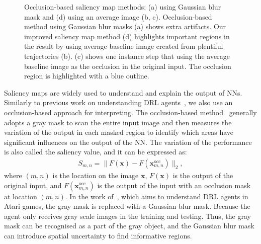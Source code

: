 \begin{figure}[h!]
\begin{subfigure}{0.24\columnwidth}
  \end{subfigure}
  \caption[Visualisation of different occlusion-based saliency map methods.]{Occlusion-based saliency map methods: (a) using Gaussian blur mask and (d) using an average image (b, c). Occlusion-based method using Gaussian blur masks (a) shows extra artifacts. Our improved saliency map method (d) highlights important regions in the result by using average baseline image created from plentiful trajectories (b). (c) shows one instance step that using the average baseline image as the occlusion in the original input. The occlusion region is highlighted with a blue outline.}
  \label{fig:saliency_baseline}
\end{figure}

Saliency maps are widely used to understand and explain the output of NNs. Similarly to previous work on understanding DRL agents~\cite{greydanus2018visualizing}, we also use an occlusion-based approach for interpreting. The occlusion-based method~\cite{zeiler2014visualizing} generally adopts a gray mask to scan the entire input image and then measures the variation of the output in each masked region to identify which areas have significant influences on the output of the NN. The variation of the performance is also called the saliency value, and it can be expressed as:
\begin{align}
S_{m, n} = \lVert F(\mathbf{x}) - F(\mathbf{x}_{m, n}^{occ}) \rVert_2,
\end{align}
where $(m, n)$ is the location on the image $\mathbf{x}$, $F(\mathbf{x})$ is the output of the original input, and $F(\mathbf{x}_{m, n}^{occ})$ is the output of the input with an occlusion mask at location $(m, n)$. In the work of~\cite{greydanus2018visualizing}, which aims to understand DRL agents in Atari games, the gray mask is replaced with a Gaussian blur mask. Because the agent only receives gray scale images in the training and testing. Thus, the gray mask can be recognised as a part of the gray object, and the Gaussian blur mask can introduce spatial uncertainty to find informative regions. 

